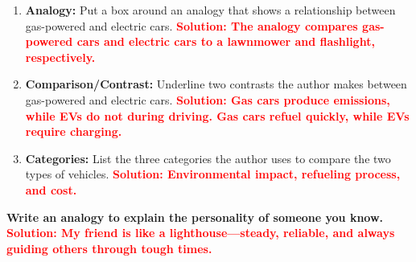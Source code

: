 \documentclass[12pt]{article}
\begin{document}
\vspace{2em}

\begin{tcolorbox}[colframe=black!60, colback=white, 
coltitle=black, colbacktitle=black!15, fonttitle=\bfseries\Large, 
title=Independent Practice, halign title=center, left=10pt, right=10pt, top=10pt, bottom=15pt]
\begin{enumerate}[itemsep=1em]
    \item \textbf{Analogy:} Put a box around an analogy that shows a relationship between gas-powered and electric cars.  
    \textcolor{red}{\textbf{Solution: The analogy compares gas-powered cars and electric cars to a lawnmower and flashlight, respectively.}}  
    \item \textbf{Comparison/Contrast:} Underline two contrasts the author makes between gas-powered and electric cars.  
    \textcolor{red}{\textbf{Solution: Gas cars produce emissions, while EVs do not during driving. Gas cars refuel quickly, while EVs require charging.}}  
    \item \textbf{Categories:} List the three categories the author uses to compare the two types of vehicles.  
    \textcolor{red}{\textbf{Solution: Environmental impact, refueling process, and cost.}}
\end{enumerate}
\end{tcolorbox}

\vspace{1em}

\begin{tcolorbox}[colframe=black!60, colback=white, 
coltitle=black, colbacktitle=black!15, fonttitle=\bfseries\Large, 
title=Exit Ticket, halign title=center, left=10pt, right=10pt, top=5pt, bottom=15pt]
\textbf{Write an analogy to explain the personality of someone you know.}  
\textcolor{red}{\textbf{Solution: My friend is like a lighthouse—steady, reliable, and always guiding others through tough times.}}
\end{tcolorbox}
\end{document}
